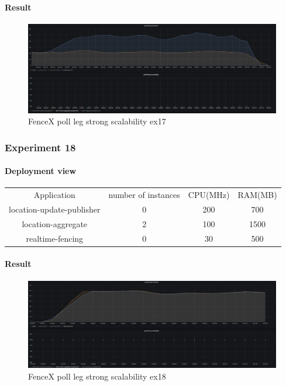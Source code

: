 \documentclass[a4]{report}
\begin{document}
        \paragraph{Result}
        \begin{figure}[ht]
            \caption{FenceX poll leg strong scalability ex17}
            \label{fig:ex17}
            \includegraphics[scale=0.4]{images/evaluation/ex17-benchmarking-ongoing-2per4sec.png}
        \end{figure}

        \subsubsection{Experiment 18}

        \paragraph{Deployment view}
        \begin{center}
            \begin{tabular}{ c c c c }
                Application               & number of instances & CPU(MHz) & RAM(MB) \\
                location-update-publisher & 0                   & 200      & 700     \\
                location-aggregate        & 2                   & 100      & 1500    \\
                realtime-fencing          & 0                   & 30       & 500     \\
            \end{tabular}
        \end{center}

        \paragraph{Result}
        \begin{figure}[ht]
            \caption{FenceX poll leg strong scalability ex18}
            \label{fig:ex18}
            \includegraphics[scale=0.4]{images/evaluation/ex18-benchmarking-ongoing-2per4sec.png}
        \end{figure}
\end{document}
